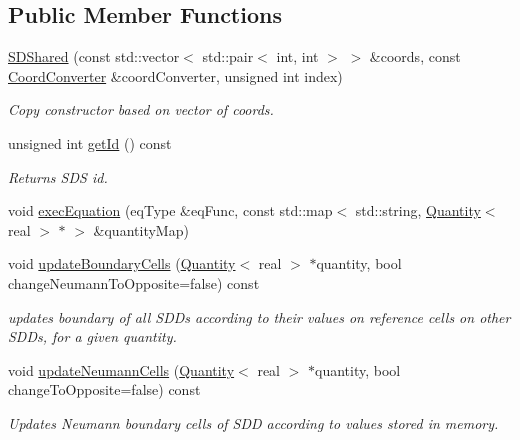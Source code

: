\subsection*{Public Member Functions}
\begin{DoxyCompactItemize}
\item 
\mbox{\label{classSDShared_afc8718fef97226eed215c34e1b453503}} 
\mbox{\hyperlink{classSDShared_afc8718fef97226eed215c34e1b453503}{S\+D\+Shared}} (const std\+::vector$<$ std\+::pair$<$ int, int $>$ $>$ \&coords, const \mbox{\hyperlink{classCoordConverter}{Coord\+Converter}} \&coord\+Converter, unsigned int index)
\begin{DoxyCompactList}\small\item\em Copy constructor based on vector of coords. \end{DoxyCompactList}\item 
unsigned int \mbox{\hyperlink{classSDShared_ab3a51f6ef83b411b8839a7953af5257d}{get\+Id}} () const
\begin{DoxyCompactList}\small\item\em Returns S\+DS id. \end{DoxyCompactList}\item 
void \mbox{\hyperlink{classSDShared_a0ba4c821b3ee742a27d72d5401602d22}{exec\+Equation}} (eq\+Type \&eq\+Func, const std\+::map$<$ std\+::string, \mbox{\hyperlink{classQuantity}{Quantity}}$<$ real $>$ $\ast$ $>$ \&quantity\+Map)
\item 
void \mbox{\hyperlink{classSDShared_ae07fd636017e1a465d537a2f21b1ef96}{update\+Boundary\+Cells}} (\mbox{\hyperlink{classQuantity}{Quantity}}$<$ real $>$ $\ast$quantity, bool change\+Neumann\+To\+Opposite=false) const
\begin{DoxyCompactList}\small\item\em updates boundary of all S\+D\+Ds according to their values on reference cells on other S\+D\+Ds, for a given quantity. \end{DoxyCompactList}\item 
void \mbox{\hyperlink{classSDShared_aadaccd75a835ca8436c223c56a791c89}{update\+Neumann\+Cells}} (\mbox{\hyperlink{classQuantity}{Quantity}}$<$ real $>$ $\ast$quantity, bool change\+To\+Opposite=false) const
\begin{DoxyCompactList}\small\item\em Updates Neumann boundary cells of S\+DD according to values stored in memory. \end{DoxyCompactList}\item 

\end{DoxyCompactItemize}
